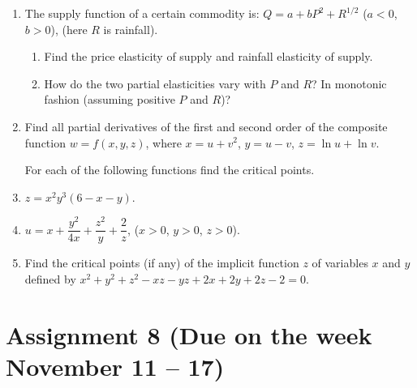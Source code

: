 \documentclass[12pt]{article} %
\theoremstyle{definition} %
\begin{document}
\begin{enumerate}
\item The supply function of a certain commodity is: $Q = a + bP^2 + R^{1/2}$ ($a<0$, $b>0$), (here $R$ is rainfall).
\begin{enumerate}
\item Find the price elasticity of supply and rainfall elasticity of supply.
\item How do the two partial elasticities vary with $P$ and $R$? In monotonic fashion (assuming positive $P$ and $R$)?
\end{enumerate}
\item Find all partial derivatives of the first and second order of the composite function $w=f(x,y,z)$, where $x=u+v^2$, $y=u-v$, $z=\ln u +\ln v$.

\medskip
For each of the following functions find the critical points.

\item $z=x^2y^3 (6-x-y)$.
\item $u=x+\dfrac {y^2}{4x}+\dfrac{z^2}{y}+\dfrac 2z$, ($x>0$, $y>0$, $z>0$).

\item Find the critical points (if any) of the implicit function $z$ of variables $x$ and $y$ defined by $x^2+y^2+z^2-xz-yz+2x+2y+2z-2=0$.
\end{enumerate}


\section{Assignment 8 (Due on the week November 11 – 17)}
\end{document}
